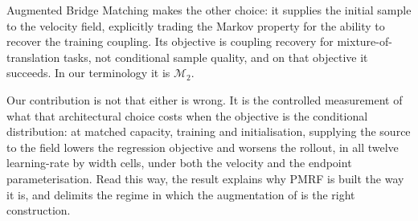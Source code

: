 Augmented Bridge Matching \citep{debortoli2023abm} makes the other choice: it supplies the initial
sample to the velocity field, explicitly trading the Markov property for the ability to recover
the training coupling. Its objective is coupling recovery for mixture-of-translation tasks, not
conditional sample quality, and on that objective it succeeds. In our terminology it is
$\mathcal M_2$.

Our contribution is not that either is wrong. It is the controlled measurement of what that
architectural choice costs when the objective is the conditional distribution: at matched
capacity, training and initialisation, supplying the source to the field lowers the regression
objective and worsens the rollout, in all twelve learning-rate by width cells, under both the
velocity and the endpoint parameterisation. Read this way, the result explains why PMRF is built
the way it is, and delimits the regime in which the augmentation of \citet{debortoli2023abm} is
the right construction.

